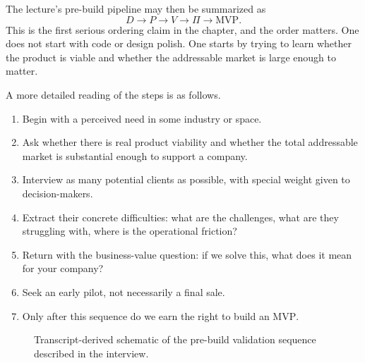 The lecture's pre-build pipeline may then be summarized as
\begin{equation}
D \rightarrow P \rightarrow V \rightarrow \Pi \rightarrow \mathrm{MVP}.
\end{equation}
This is the first serious ordering claim in the chapter, and the order matters. One does not start with code or design polish. One starts by trying to learn whether the product is viable and whether the addressable market is large enough to matter.

A more detailed reading of the steps is as follows.
\begin{enumerate}
\item Begin with a perceived need in some industry or space.
\item Ask whether there is real product viability and whether the total addressable market is substantial enough to support a company.
\item Interview as many potential clients as possible, with special weight given to decision-makers.
\item Extract their concrete difficulties: what are the challenges, what are they struggling with, where is the operational friction?
\item Return with the business-value question: if we solve this, what does it mean for your company?
\item Seek an early pilot, not necessarily a final sale.
\item Only after this sequence do we earn the right to build an \(\mathrm{MVP}\).
\end{enumerate}

\begin{figure}[h]
\centering
{}
\caption{Transcript-derived schematic of the pre-build validation sequence described in the interview.}
\end{figure}

